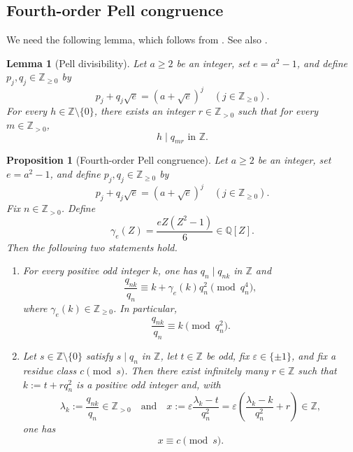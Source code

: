 \documentclass[12pt]{amsart}
\numberwithin{equation}{section}
\newtheorem{proposition}[theorem]{Proposition}
\newtheorem{lemma}[theorem]{Lemma}
\theoremstyle{remark}
\theoremstyle{plain}
\newcommand{\Z}{\mathbb{Z}}
\newcommand{\Q}{\mathbb{Q}}
\begin{document}
\subsection{Fourth-order Pell congruence}
We need the following lemma, which follows from \cite[p.~27]{BW23}. See also \cite[Lemma~3.5]{Sun26}.
\begin{lemma}[Pell divisibility]\label{lem:pell-div}
Let $a\geq2$ be an integer, set $e=a^2-1$, and define $p_j,q_j\in\Z_{\geq0}$ by
\[
p_j+q_j\sqrt{e}=(a+\sqrt{e})^j\quad(j\in\Z_{\geq0}).
\]
For every $h\in\Z\setminus\{0\}$, there exists an integer $r\in\Z_{>0}$ such that for every $m\in\Z_{>0}$,
\[
h\mid q_{m r}\text{ in }\Z.
\]
\end{lemma}

\begin{proposition}[Fourth-order Pell congruence]\label{prop:pell-star}
Let $a\geq2$ be an integer, set $e=a^2-1$, and define $p_j,q_j\in\Z_{\geq0}$ by
\[
p_j+q_j\sqrt{e}=(a+\sqrt{e})^j\quad(j\in\Z_{\geq0}).
\]
Fix $n\in\Z_{>0}$. Define
\[
\gamma_e(Z)=\frac{eZ(Z^2-1)}{6}\in\Q[Z].
\]
Then the following two statements hold.
\begin{enumerate}[label=\textup{(\arabic*)}]
	\item
	For every positive odd integer $k$, one has $q_n\mid q_{nk}$ in $\Z$ and
	\[
	\frac{q_{nk}}{q_n}\equiv k+\gamma_e(k)q_n^2\pmod{q_n^4},
	\]
	where $\gamma_e(k)\in\Z_{\geq0}$. In particular,
	\[
	\frac{q_{nk}}{q_n}\equiv k\pmod{q_n^2}.
	\]
	
	\item
	Let $s\in\Z\setminus\{0\}$ satisfy $s\mid q_n$ in $\Z$, let $t\in\Z$ be odd, fix $\varepsilon\in\{\pm1\}$, and fix a residue class $c\pmod{s}$. Then there exist infinitely many $r\in\Z$ such that $k:=t+r q_n^2$ is a positive odd integer and, with
	\[
	\lambda_k:=\frac{q_{nk}}{q_n}\in\Z_{>0}\quad\text{and}\quad
	x:=\varepsilon\frac{\lambda_k-t}{q_n^2}=\varepsilon\left(\frac{\lambda_k-k}{q_n^2}+r\right)\in\Z,
	\]
	one has
	\[
	x\equiv c\pmod{s}.
	\]
\end{enumerate}
\end{proposition}
\end{document}
